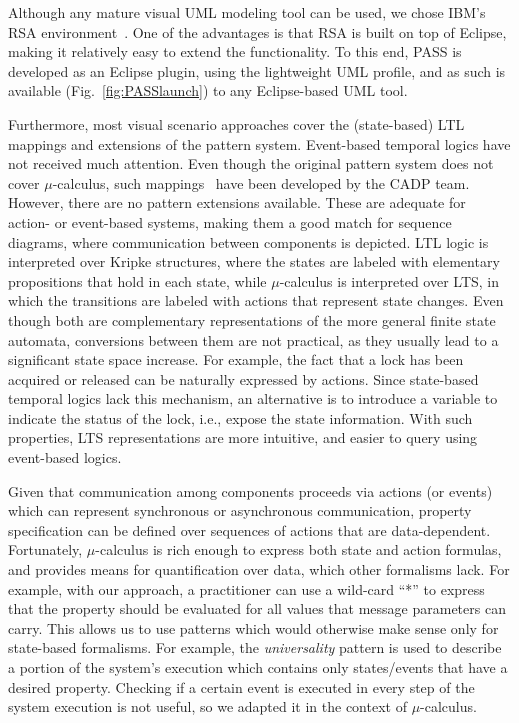 \documentclass[letter]{llncs}
\begin{document}
Although any mature visual UML modeling tool 
can be used, we chose IBM's RSA environment~\cite{terry2006visual}.
One of the advantages is that RSA is built on top of Eclipse, making 
it relatively easy to extend the functionality. To this end, PASS is developed as an Eclipse plugin, using the 
lightweight UML profile, and as such is available (Fig.~\ref{fig:PASSlaunch}) to any Eclipse-based UML tool.

Furthermore, most visual scenario approaches cover the (state-based) LTL mappings and extensions of the pattern system. 
Event-based temporal logics have not received much attention. Even though the original pattern 
system does not cover $\mu$-calculus, such mappings~\cite{RAFMC} have been developed by the CADP team.
However, there are no pattern extensions available. These are adequate for action- or event-based systems,
making them a good match for sequence diagrams, where communication between components is depicted.
LTL logic is interpreted over Kripke structures, where the states are labeled with elementary 
propositions that hold in each state, while $\mu$-calculus is interpreted over LTS, in which the transitions
are labeled with actions that represent state changes.
Even though both are complementary representations of the more general finite state automata, 
conversions between them are not practical, as they usually lead to a significant state space increase. 
For example, the fact that a lock has
been acquired or released can be naturally expressed by actions. Since state-based
temporal logics lack this mechanism, an alternative is to introduce a variable to indicate
the status of the lock, i.e., expose the state information. With such properties, LTS
representations are more intuitive, and easier to query using event-based logics.

Given that communication among components proceeds via actions (or events) which can
represent synchronous or asynchronous communication, property specification
can be defined over sequences of actions that are data-dependent.
Fortunately, $\mu$-calculus is rich enough to express both state and action formulas,
and provides means for quantification over data, which other formalisms lack. 
For example, with our approach, a practitioner can use 
a wild-card ``*'' to express that the property should be evaluated for all values
that message parameters can carry. This allows us to use patterns which would otherwise
make sense only for state-based formalisms. For example, the \emph{universality}
pattern is used to describe a portion of the system's execution which contains only states/events that have a desired property.
Checking if a certain event is executed in every step of the system execution is not useful,
so we adapted it in the context of $\mu$-calculus. 
\end{document}
